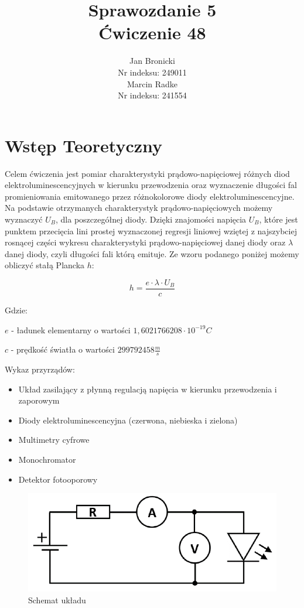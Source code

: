 \documentclass{article}
\title{Sprawozdanie 5\\ Ćwiczenie 48}
\author{Jan Bronicki \\
Nr indeksu: 249011\\
Marcin Radke\\
Nr indeksu: 241554}
\date{}
\begin{document}
\maketitle

\section{Wstęp Teoretyczny}
\par Celem ćwiczenia jest pomiar charakterystyki prądowo-napięciowej różnych diod elektroluminescencyjnych w kierunku przewodzenia oraz wyznaczenie długości fal promieniowania emitowanego przez różnokolorowe diody elektroluminescencyjne.
Na podstawie otrzymanych charakterystyk prądowo-napięciowych możemy wyznaczyć $U_{B}$, dla poszczegółnej diody. Dzięki znajomości napięcia $U_{B}$, które jest punktem przecięcia lini prostej wyznaczonej regresji liniowej wziętej z najszybciej rosnącej części wykresu charakterystyki prądowo-napięciowej danej diody oraz $\lambda$ danej diody, czyli długości fali którą emituje. Ze wzoru podanego poniżej możemy obliczyć stałą Plancka $h$:
\vspace{-3ex}
\begin{center}
    $$
    h=\frac{e\cdot \lambda \cdot U_{B}}{c}
    $$
\end{center}
Gdzie:
\par $e$ - ładunek elementarny o wartości $1,6021766208\cdot 10^{−19} C$
\vspace{1.5ex}
\par $c$ - prędkość światła o wartości $ 299 792 458 \frac{m}{s}$\\
\vspace{-2ex}
\begin{flushleft}

Wykaz przyrządów:
\end{flushleft}
\begin{itemize}
    \item Układ zasilający z płynną regulacją napięcia w kierunku przewodzenia i zaporowym
    \item Diody elektroluminescencyjna (czerwona, niebieska i zielona)
    \item Multimetry cyfrowe
    \item Monochromator
    \item Detektor fotooporowy
\end{itemize}


\begin{figure}[h!]
    \centering
    \includegraphics[scale=0.65]{Schemat.PNG}
    \caption{Schemat układu}
\end{figure}
\end{document}
